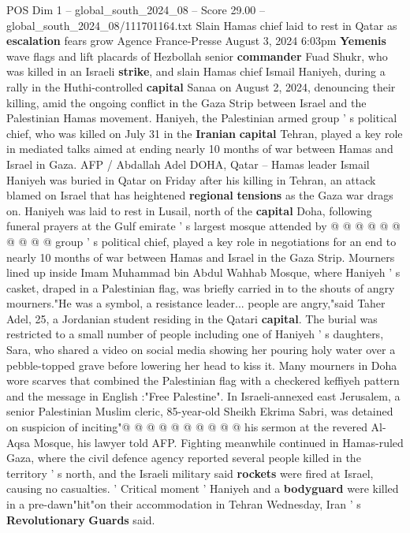 \begin{textsample}{POS Dim 1 – global\_south\_2024\_08 – Score 29.00 – global\_south\_2024\_08/111701164.txt}  \label{ex:f1_pos_015}
Slain Hamas chief laid to rest in Qatar as \textbf{escalation} fears grow Agence France-Presse August 3, 2024 6:03pm \textbf{Yemenis} wave flags and lift placards of Hezbollah senior \textbf{commander} Fuad Shukr, who was killed in an Israeli \textbf{strike}, and slain Hamas chief Ismail Haniyeh, during a rally in the Huthi-controlled \textbf{capital} Sanaa on August 2, 2024, denouncing their killing, amid the ongoing conflict in the Gaza Strip between Israel and the Palestinian Hamas movement.
Haniyeh, the Palestinian armed group ' s political chief, who was killed on July 31 in the \textbf{Iranian} \textbf{capital} Tehran, played a key role in mediated talks aimed at ending nearly 10 months of war between Hamas and Israel in Gaza.
AFP / Abdallah Adel DOHA, Qatar -- Hamas leader Ismail Haniyeh was buried in Qatar on Friday after his killing in Tehran, an attack blamed on Israel that has heightened \textbf{regional} \textbf{tensions} as the Gaza war drags on.
Haniyeh was laid to rest in Lusail, north of the \textbf{capital} Doha, following funeral prayers at the Gulf emirate ' s largest mosque attended by @ @ @ @ @ @ @ @ @ @ group ' s political chief, played a key role in negotiations for an end to nearly 10 months of war between Hamas and Israel in the Gaza Strip.
Mourners lined up inside Imam Muhammad bin Abdul Wahhab Mosque, where Haniyeh ' s casket, draped in a Palestinian flag, was briefly carried in to the shouts of angry mourners."He was a symbol, a resistance leader... people are angry,"said Taher Adel, 25, a Jordanian student residing in the Qatari \textbf{capital}.
The burial was restricted to a small number of people including one of Haniyeh ' s daughters, Sara, who shared a video on social media showing her pouring holy water over a pebble-topped grave before lowering her head to kiss it.
Many mourners in Doha wore scarves that combined the Palestinian flag with a checkered keffiyeh pattern and the message in English :"Free Palestine".
In Israeli-annexed east Jerusalem, a senior Palestinian Muslim cleric, 85-year-old Sheikh Ekrima Sabri, was detained on suspicion of inciting"@ @ @ @ @ @ @ @ @ @ his sermon at the revered Al-Aqsa Mosque, his lawyer told AFP.
Fighting meanwhile continued in Hamas-ruled Gaza, where the civil defence agency reported several people killed in the territory ' s north, and the Israeli military said \textbf{rockets} were fired at Israel, causing no casualties. ' Critical moment ' Haniyeh and a \textbf{bodyguard} were killed in a pre-dawn"hit"on their accommodation in Tehran Wednesday, Iran ' s \textbf{Revolutionary} \textbf{Guards} said.

\end{textsample}
